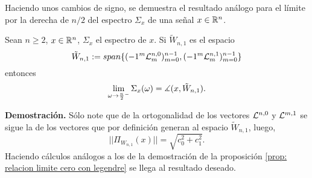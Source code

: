 Haciendo unos cambios de signo, se demuestra el resultado
análogo para el límite por la derecha de $n/2$ del espectro
$\Sigma_{x}$ de una señal $x \in \mathbb{R}^{n}$.
\begin{prop}
\label{prop: relacion limite n medios con legendre}
Sean $n \geq 2$, $x \in \mathbb{R}^{n}$,
$\Sigma_{x}$ el espectro de $x$.
Si $\tilde{W}_{n,1}$ es el espacio
\[
\tilde{W}_{n,1} := span \{ (-1^{m}\mathcal{L}^{n,0}_{m})_{m=0}^{n-1}, 
(-1^{m}\mathcal{L}^{n,1}_{m})_{m=0}^{n-1} \}
\]
entonces
\begin{equation}
\label{eq: limite por cero como angulo}
\lim\limits_{\omega \rightarrow \frac{n}{2}^{-}}{
\Sigma_{x}(\omega)} = \measuredangle(x, \tilde{W}_{n,1}).
\end{equation}
\end{prop}
\noindent
\textbf{Demostración.}
Sólo note que de la ortogonalidad de los
vectores $\mathcal{L}^{n,0}$ y $\mathcal{L}^{m,1}$
se sigue la de los vectores que por definición generan
al espacio $\tilde{W}_{n,1}$, 
luego, 
\begin{equation*}
||\Pi_{W_{n,1}}(x)|| = \sqrt{c_{0}^{2} + c_{1}^{2}}.
\end{equation*}
Haciendo cálculos análogos a los
de la demostración de la proposición 
\ref{prop: relacion limite cero con legendre} se llega
al resultado deseado.
\QEDB
\vspace{0.2cm}

\begin{comment}
Esta última proposición es importante, pues relaciona
el espectro de una señal 
con sus primeros dos coeficientes respecto a la base
de Legendre discreta $\cali{L}^{n}$. \\
Note que este es un resultado razonable, pues, por
definición del espectro $\Sigma_{x}$, si $\omega \geq 0$,
$\Sigma_{x}(\omega)$ es el coseno del ángulo que
$x$ forma con el espacio $P_{n, \omega} = 
span \left\{ cos \left(
2 \pi \omega\frac{m}{n}
\right)_{m=0}^{n-1},  
sen \left(
2 \pi \omega\frac{m}{n}
\right)_{m=0}^{n-1} \right\}$, y, conforme
$\omega$ tiende a cero por la derecha, 
las discretizaciones de coseno y seno que generan
el espacio $P_{n, \omega}$ tienden a ser las discretizaciones
de cosenos y senos de muy baja frecuencia, luego, intuitivamente
son las discretizaciones de las rectas tangentes de un coseno
y un seno en $t =0$, que son las rectas $y=1$
y $y =x$. Observe que discretizaciones de estas dos rectas
conforman una base para el espacio $W_{n,1}$.
\end{comment}
 
 
 
